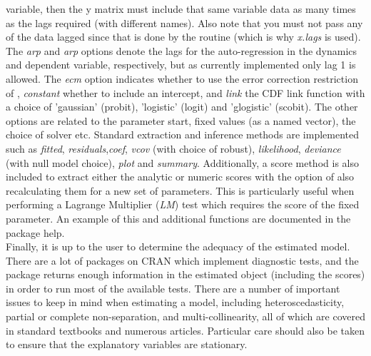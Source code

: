 variable, then the y matrix must include that same variable data as many times as the lags required (with different names). Also note that you must
not pass any of the data lagged since that is done by the routine (which is why \emph{x.lags} is used). The \emph{arp} and \emph{arp} options denote
the lags for the auto-regression in the dynamics and dependent variable, respectively, but as currently implemented only lag 1 is allowed. The \emph{ecm}
option indicates whether to use the error correction restriction of \cite{Nyberg2011}, \emph{constant} whether to include an intercept, and \emph{link}
the CDF link function with a choice of 'gaussian' (probit), 'logistic' (logit) and 'glogistic' (scobit). The other options are related to
the parameter start, fixed values (as a named vector), the choice of solver etc. Standard extraction and inference methods are implemented such as 
\emph{fitted}, \emph{residuals},\emph{coef}, \emph{vcov} (with choice of robust), \emph{likelihood}, \emph{deviance} (with null model choice), 
\emph{plot} and \emph{summary}. Additionally, a score method is also included to extract either the analytic or numeric scores with the option of 
also recalculating them for a new set of parameters. This is particularly useful when performing a Lagrange Multiplier (\emph{LM}) test which requires 
the score of the fixed parameter. An example of this and additional functions are documented in the package help.\\
Finally, it is up to the user to determine the adequacy of the estimated model. There are a lot of packages on CRAN which implement diagnostic tests, and
the \verb@dbm@ package returns enough information in the estimated object (including the scores) in order to run most of the available tests. There are a
number of important issues to keep in mind when estimating a model, including heteroscedasticity, partial or complete non-separation, and
multi-collinearity, all of which are covered in standard textbooks and numerous articles. Particular care should also be taken to ensure that
the explanatory variables are stationary.
